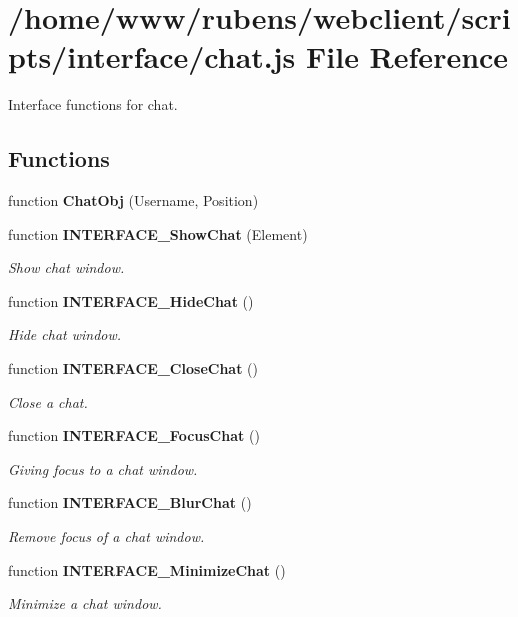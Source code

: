 \section{/home/www/rubens/webclient/scripts/interface/chat.js File Reference}
\label{interface_2chat_8js}
Interface functions for chat. 

\subsection*{Functions}
\begin{CompactItemize}
\item 
function {\bf ChatObj} (Username, Position)
\item 
function {\bf INTERFACE\_\-ShowChat} (Element)
\begin{CompactList}\small\item\em Show chat window. \item\end{CompactList}\item 
function {\bf INTERFACE\_\-HideChat} ()
\begin{CompactList}\small\item\em Hide chat window. \item\end{CompactList}\item 
function {\bf INTERFACE\_\-CloseChat} ()
\begin{CompactList}\small\item\em Close a chat. \item\end{CompactList}\item 
function {\bf INTERFACE\_\-FocusChat} ()
\begin{CompactList}\small\item\em Giving focus to a chat window. \item\end{CompactList}\item 
function {\bf INTERFACE\_\-BlurChat} ()
\begin{CompactList}\small\item\em Remove focus of a chat window. \item\end{CompactList}\item 
function {\bf INTERFACE\_\-MinimizeChat} ()
\begin{CompactList}\small\item\em Minimize a chat window. \item\end{CompactList}\item 

\end{CompactItemize}
